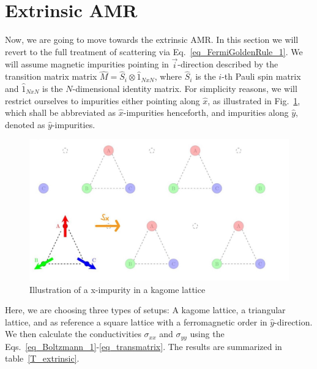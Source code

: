 \documentclass[prb,showpacs,amsmath,amssymb,superscriptaddress,twocolumn,floatfix]{revtex4-1}
\begin{document}
\section{Extrinsic AMR}
\label{sec_extrinsic}

Now, we are going to move towards the extrinsic AMR. In this section we will revert to the full treatment of scattering via Eq.~\ref{eq_FermiGoldenRule_1}. We will assume magnetic impurities pointing in $\vec{i}$-direction described by the transition matrix matrix $\hat{M} = \hat{S}_i \otimes \hat{1}_{NxN}$, where $\hat{S}_i$ is the $i$-th Pauli spin matrix and $\hat{1}_{NxN}$ is the $N$-dimensional identity matrix. For simplicity reasons, we will restrict ourselves to impurities either pointing along $\hat{x}$, as illustrated in Fig.~\ref{fig:kagome21}, which shall be abbreviated as $\hat{x}$-impurities henceforth, and impurities along $\hat{y}$, denoted as $\hat{y}$-impurities.

\begin{figure}
	\centering
	\includegraphics[width=0.8\linewidth]{img/Kagome_21}
	\caption{Illustration of a x-impurity in a kagome lattice}
	\label{fig:kagome21}
\end{figure}


Here, we are choosing three types of setups: A kagome lattice, a triangular lattice, and as reference a square lattice with a ferromagnetic order in $\hat{y}$-direction. We then calculate the conductivities $\sigma_{xx}$ and $\sigma_{yy}$ using the Eqs.~\ref{eq_Boltzmann_1}-\ref{eq_transmatrix}. The results are summarized in table~\ref{T_extrinsic}.
\end{document}
